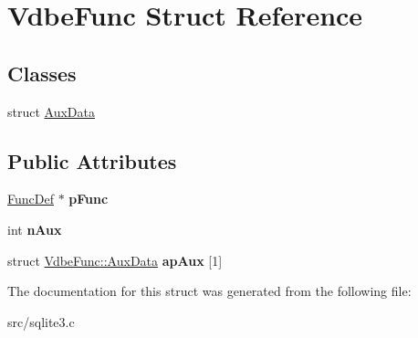 \hypertarget{struct_vdbe_func}{\section{Vdbe\-Func Struct Reference}
\label{struct_vdbe_func}
}
\subsection*{Classes}
\begin{DoxyCompactItemize}
\item 
struct \hyperlink{struct_vdbe_func_1_1_aux_data}{Aux\-Data}
\end{DoxyCompactItemize}
\subsection*{Public Attributes}
\begin{DoxyCompactItemize}
\item 
\hypertarget{struct_vdbe_func_a73cbc96029bec2f37c7e2a79052a2f65}{\hyperlink{struct_func_def}{Func\-Def} $\ast$ {\bfseries p\-Func}}\label{struct_vdbe_func_a73cbc96029bec2f37c7e2a79052a2f65}

\item 
\hypertarget{struct_vdbe_func_ad78feda4c310ea0bc17b7bba53bccd3c}{int {\bfseries n\-Aux}}\label{struct_vdbe_func_ad78feda4c310ea0bc17b7bba53bccd3c}

\item 
\hypertarget{struct_vdbe_func_abb466d61a0d36b913418460e5922166a}{struct \hyperlink{struct_vdbe_func_1_1_aux_data}{Vdbe\-Func\-::\-Aux\-Data} {\bfseries ap\-Aux} \mbox{[}1\mbox{]}}\label{struct_vdbe_func_abb466d61a0d36b913418460e5922166a}

\end{DoxyCompactItemize}


The documentation for this struct was generated from the following file\-:\begin{DoxyCompactItemize}
\item 
src/sqlite3.\-c\end{DoxyCompactItemize}
